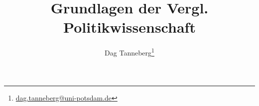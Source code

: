 \usepackage[ngerman]{babel}
\usepackage{booktabs}
\usepackage{graphicx}
\usepackage{hyperref}
\usepackage{multirow}
\usepackage{adjustbox}
\usepackage{tikz}
    \usetikzlibrary{positioning,calc}

\title{Grundlagen der Vergl. Politikwissenschaft}
\author{Dag Tanneberg\thanks{%
  \href{mailto:dag.tanneberg@uni-potsdam.de}%
    {dag.tanneberg@uni-potsdam.de}
  }
}
\hypersetup{colorlinks, urlcolor = red, linkcolor = }

\newcommand*{\priority}[1]{\begin{tikzpicture}[scale=0.15]%
    \draw (0,0) circle (1);
    \fill[fill opacity=.4, fill=black] (0,0) -- (90:1) arc (90:90-#1*3.6:1) -- cycle;
    \end{tikzpicture}}